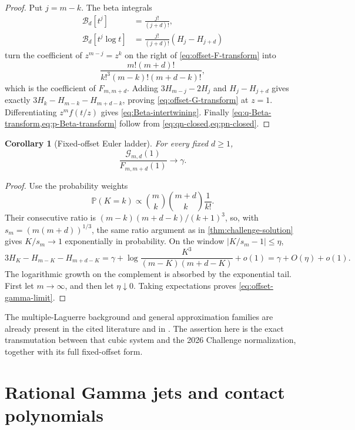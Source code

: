 \documentclass[11pt]{article}
\theoremstyle{keio}
\newtheorem{corollary}[theorem]{Corollary}
\theoremstyle{definition}
\theoremstyle{remark}
\newcommand{\Prob}{\mathbb P}
\begin{document}
\begin{proof}
Put \(j=m-k\).  The beta integrals
\begin{align*}
 \mathcal B_d[t^j]&=\frac{j!}{(j+d)!},\\
 \mathcal B_d[t^j\log t]&=\frac{j!}{(j+d)!}(H_j-H_{j+d})
\end{align*}
turn the coefficient of \(z^{m-j}=z^k\) on the right of
\eqref{eq:offset-F-transform} into
\[
 \frac{m!(m+d)!}{k!^3(m-k)!(m+d-k)!},
\]
which is the coefficient of \(F_{m,m+d}\).  Adding
\(3H_{m-j}-2H_j\) and \(H_j-H_{j+d}\) gives exactly
\(3H_k-H_{m-k}-H_{m+d-k}\), proving
\eqref{eq:offset-G-transform} at \(z=1\).  Differentiating
\(z^mf(t/z)\) gives
\eqref{eq:Beta-intertwining}.  Finally
\cref{eq:q-Beta-transform,eq:p-Beta-transform} follow from
\cref{eq:qn-closed,eq:pn-closed}.
\end{proof}

\begin{corollary}[Fixed-offset Euler ladder]
\label{cor:offset-ladder}
For every fixed \(d\ge1\),
\begin{equation}\label{eq:offset-gamma-limit}
 \boxed{\displaystyle
 \frac{\mathcal G_{m,d}(1)}{F_{m,m+d}(1)}\longrightarrow\gamma.}
\end{equation}
\end{corollary}

\begin{proof}
Use the probability weights
\[
 \Prob(K=k)\propto\binom mk\binom{m+d}k\frac1{k!}.
\]
Their consecutive ratio is
\((m-k)(m+d-k)/(k+1)^3\), so, with
\(s_m=(m(m+d))^{1/3}\), the same ratio argument as in
\cref{thm:challenge-solution} gives \(K/s_m\to1\) exponentially in
probability.  On the window \(|K/s_m-1|\le\eta\),
\[
 3H_K-H_{m-K}-H_{m+d-K}
 =\gamma+\log\frac{K^3}{(m-K)(m+d-K)}+o(1)
 =\gamma+O(\eta)+o(1).
\]
The logarithmic growth on the complement is absorbed by the exponential
tail.  First let \(m\to\infty\), and then let \(\eta\downarrow0\).
Taking expectations proves \eqref{eq:offset-gamma-limit}.
\end{proof}

The multiple-Laguerre background and general approximation families are
already present in the cited literature and in
\cite{WolfsVanAssche2025}.  The assertion here is the exact transmutation
between that cubic system and the 2026 Challenge normalization, together
with its full fixed-offset form.

\section{Rational Gamma jets and contact polynomials}
\label{sec:gamma-jets}
\end{document}
